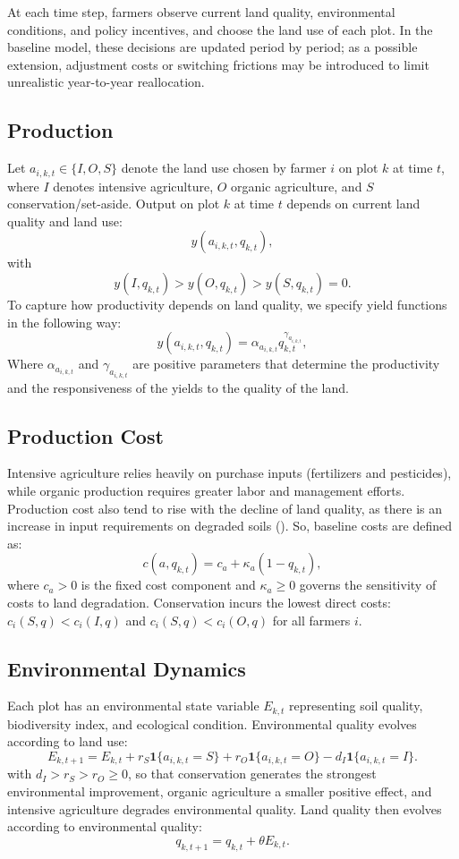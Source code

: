 \documentclass{article}
\begin{document}
At each time step, farmers observe current land quality, environmental conditions, and policy incentives, and choose the land use of each plot. In the baseline model, these decisions are updated period by period; as a possible extension, adjustment costs or switching frictions may be introduced to limit unrealistic year-to-year reallocation.

\subsection{Production}
Let $a_{i,k,t} \in \{I,O,S\}$ denote the land use chosen by farmer $i$ on plot $k$ at time $t$, where $I$ denotes intensive agriculture, $O$ organic agriculture, and $S$ conservation/set-aside. Output on plot $k$ at time $t$ depends on current land quality and land use:
\[
y(a_{i,k,t}, q_{k,t}),
\]
with
\[
y(I,q_{k,t}) > y(O,q_{k,t}) > y(S,q_{k,t}) = 0.
\]
To capture how productivity depends on land quality, we specify yield functions in the following way:
\[
y(a_{i,k,t},q_{k,t}) = \alpha_{a_{i,k,t}} q_{k,t}^{\gamma_{a_{i,k,t}}}, 
\]
Where $\alpha_{a_{i,k,t}}$ and $\gamma_{a_{i,k,t}}$ are positive parameters that determine the productivity and the responsiveness of the yields to the quality of the land. 

\subsection{Production Cost}
Intensive agriculture relies heavily on purchase inputs (fertilizers and pesticides), while organic production requires greater labor and management efforts. Production cost also tend to rise with the decline of land quality, as there is an increase in input requirements on degraded soils (\cite{usda2010impact, durham2021economics}). So, baseline costs are defined as:
$$c(a, q_{k,t}) = c_a + \kappa_a (1 - q_{k,t}),$$
where $c_a > 0$ is the fixed cost component and $\kappa_a \ge0$ governs the sensitivity of costs to land degradation. Conservation incurs the lowest direct costs: $c_i(S, q) < c_i(I, q)$ and $c_i(S, q) < c_i(O, q)$ for all farmers $i$.

\subsection{Environmental Dynamics}
Each plot has an environmental state variable $E_{k,t}$ representing soil quality, biodiversity index, and ecological condition. Environmental quality evolves according to land use:
\[
E_{k,t+1} = E_{k,t} + r_S \mathbf{1}\{a_{i,k,t}=S\} + r_O \mathbf{1}\{a_{i,k,t}=O\} - d_I \mathbf{1}\{a_{i,k,t}=I\}.
\]
with $d_I > r_S > r_O \geq 0$, so that conservation generates the strongest environmental improvement, organic agriculture a smaller positive effect, and intensive agriculture degrades environmental quality. Land quality then evolves according to environmental quality:
\[
q_{k,t+1} = q_{k,t} + \theta E_{k,t}.
\]
\end{document}
